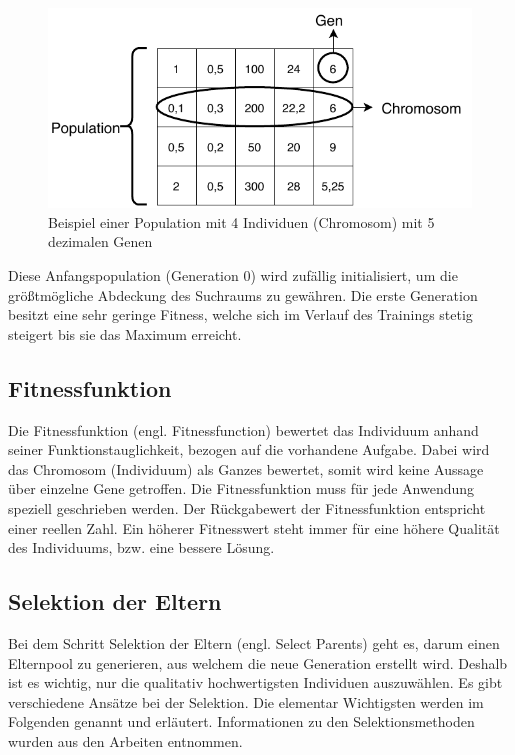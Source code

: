 \noindent%
\begin{figure}[H]
  \centering  
  \includegraphics[scale=0.9]{img/population_ohne.pdf}
  \caption{Beispiel einer Population mit 4 Individuen (Chromosom) mit 5 dezimalen Genen}
  \label{fig:population}
\end{figure}

Diese Anfangspopulation (Generation 0) wird zufällig initialisiert, um die größtmögliche Abdeckung des Suchraums zu gewähren. Die erste Generation besitzt eine sehr geringe Fitness, welche sich im Verlauf des Trainings stetig steigert bis sie das Maximum erreicht.

\subsection{Fitnessfunktion}
Die Fitnessfunktion (engl. Fitnessfunction) bewertet das Individuum anhand seiner Funktionstauglichkeit, bezogen auf die vorhandene Aufgabe. Dabei wird das Chromosom (Individuum) als Ganzes bewertet, somit wird keine Aussage über einzelne Gene getroffen. Die Fitnessfunktion muss für jede Anwendung speziell geschrieben werden. Der Rückgabewert der Fitnessfunktion entspricht einer reellen Zahl. Ein höherer Fitnesswert steht immer für eine höhere Qualität des Individuums, bzw. eine bessere Lösung\cite[p.~135]{Gad2018}. 

\newpage

\subsection{Selektion der Eltern} \label{Grundlagen_eltern_selektion}
Bei dem Schritt Selektion der Eltern (engl. Select Parents) geht es, darum einen Elternpool zu generieren, aus welchem die neue Generation erstellt wird. Deshalb ist es wichtig, nur die qualitativ hochwertigsten Individuen auszuwählen. Es gibt verschiedene Ansätze bei der Selektion. Die elementar Wichtigsten werden im Folgenden genannt und erläutert. Informationen zu den Selektionsmethoden wurden aus den Arbeiten \cite{shukla15} \cite[p.~80]{eiben2003introduction} entnommen.

